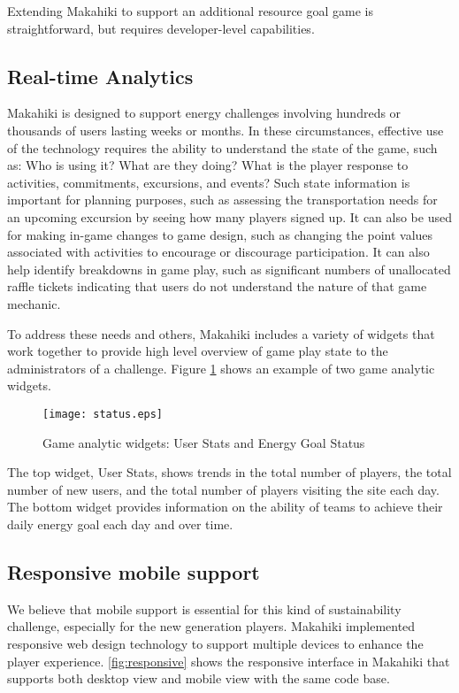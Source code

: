 Extending Makahiki to support an additional resource goal game is straightforward, but requires developer-level capabilities.

\subsection{Real-time Analytics}

Makahiki is designed to support energy challenges involving hundreds or thousands of users lasting weeks or months.  In these circumstances, effective use of the technology requires the ability to understand the state of the game, such as: Who is using it? What are they doing? What is the player response to activities, commitments, excursions, and events?   Such state information is important for planning purposes, such as assessing the transportation needs for an upcoming excursion by seeing how many players signed up.   It can also be used for making in-game changes to game design, such as changing the point values associated with activities to encourage or discourage participation.  It can also help identify breakdowns in game play, such as significant numbers of unallocated raffle tickets indicating that users do not understand the nature of that game mechanic.

To address these needs and others, Makahiki includes a variety of widgets that work together to provide high level overview of game play state to the administrators of a challenge. Figure \ref{fig:status} shows an example of two game analytic widgets.

\begin{figure}[!ht]
  \center
  \texttt{[image: status.eps]}
  \caption{Game analytic widgets: User Stats and Energy Goal Status}
  \label{fig:status}
\end{figure}

The top widget, User Stats, shows trends in the total number of players, the total number of new users, and the total number of players visiting the site each day.  The bottom widget provides information on the ability of teams to achieve their daily energy goal each day and over time.

\clearpage

\subsection{Responsive mobile support}
We believe that mobile support is essential for this kind of sustainability challenge, especially for the new generation players. Makahiki implemented  responsive web design technology to support multiple devices to enhance the player experience. \autoref{fig:responsive} shows the responsive interface in Makahiki that supports both desktop view and mobile view with the same code base.

